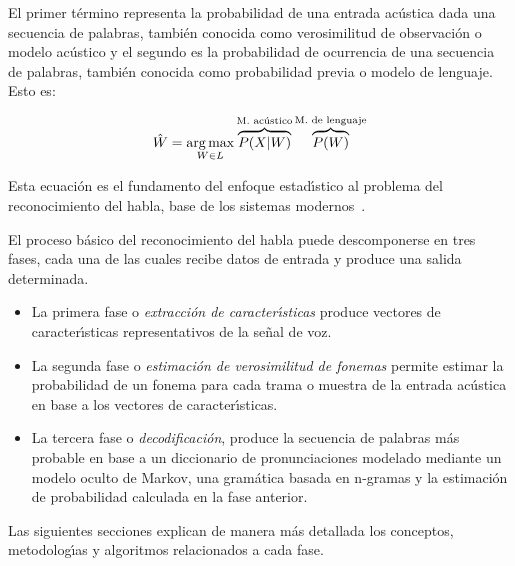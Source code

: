 El primer t\'ermino representa la probabilidad de una entrada ac\'ustica dada una secuencia de palabras, tambi\'en
conocida como verosimilitud de observaci\'on o modelo ac\'ustico y el segundo es la probabilidad 
de ocurrencia de una secuencia de palabras, tambi\'en conocida como probabilidad previa o modelo de lenguaje. Esto es:

\begin{equation*}
\hat{W} = \operatorname*{arg\,max}_{W \in L} \overbrace{P(X|W)}^\text{M. ac\'ustico}\overbrace{P(W)}^\text{M. de lenguaje}
\end{equation*}

Esta ecuaci\'on es el fundamento del enfoque estad{\'\i}stico al problema del reconocimiento del habla, base de los
sistemas \mbox{modernos \cite{RabinerStatistical2006}}.

El proceso b\'asico del reconocimiento del habla puede descomponerse en tres fases, cada una de las cuales recibe
datos de entrada y produce una salida determinada.

\begin{itemize}
\item La primera fase o \emph{extracci\'on de caracter{\'\i}sticas} produce vectores de caracter{\'\i}sticas representativos de la se\~nal de voz.
\item La segunda fase o \emph{estimaci\'on de verosimilitud de fonemas} permite estimar la probabilidad de un fonema para cada trama o muestra de la entrada ac\'ustica en base a los vectores de caracter{\'\i}sticas.
\item La tercera fase o \emph{decodificaci\'on}, produce la secuencia de palabras m\'as probable en base a un diccionario de pronunciaciones modelado mediante un modelo oculto de Markov, una gram\'atica basada en n-gramas y la estimaci\'on de probabilidad calculada en la fase anterior.
\end{itemize}

Las siguientes secciones explican de manera m\'as detallada los conceptos, metodolog{\'\i}as y algoritmos relacionados a cada fase.




